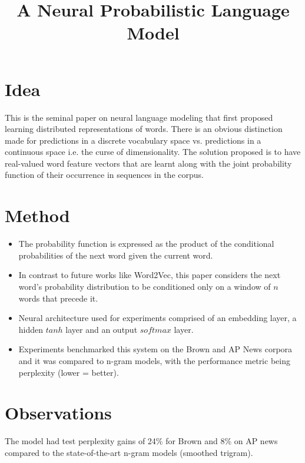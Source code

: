 \documentclass[12pt]{article}
\begin{document}
\title{A Neural Probabilistic Language Model}
\author{}
\date{}
\maketitle

\section{Idea}
  This is the seminal paper on neural language modeling that first proposed learning distributed representations of words. There is an obvious distinction made for predictions in a discrete vocabulary space vs. predictions in a continuous space i.e. the curse of dimensionality. The solution proposed is to have real-valued word feature vectors that are learnt along with the joint probability function of their occurrence in sequences in the corpus.

\section{Method}
  \begin{itemize}
    \item The probability function is expressed as the product of the conditional probabilities of the next word given the current word.
    \item In contrast to future works like Word2Vec, this paper considers the next word's probability distribution to be conditioned only on a window of $n$ words that precede it.
    \item Neural architecture used for experiments comprised of an embedding layer, a hidden $tanh$ layer and an output $softmax$ layer.
    \item Experiments benchmarked this system on the Brown and AP News corpora and it was compared to n-gram models, with the performance metric being perplexity (lower = better).
  \end{itemize}

\section{Observations}
  The model had test perplexity gains of 24\% for Brown and 8\% on AP news compared to the state-of-the-art n-gram models (smoothed trigram).
\end{document}
